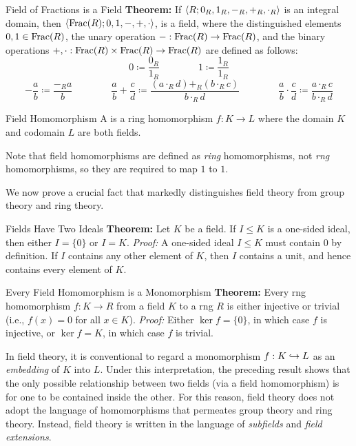 \begin{thmbox}{Field of Fractions is a Field}
	\textbf{Theorem:} If ${\langle {R; 0_R, 1_R, -_R, +_R, \cdot_R} \rangle}$ is an integral domain, then ${\langle {\operatorname{Frac}(R); 0, 1, -, +, \cdot} \rangle}$, is a field, where the distinguished elements $0, 1 \in \operatorname{Frac}(R)$, the unary operation $-: \operatorname{Frac}(R) \to \operatorname{Frac}(R)$, and the binary operations $+, \cdot: \operatorname{Frac}(R) \times \operatorname{Frac}(R) \to \operatorname{Frac}(R)$ are defined as follows:
	\[ 0 \coloneq \frac{0_R}{1_R}
	\qquad\qquad
	1 \coloneq \frac{1_R}{1_R} \]
	\[ -\frac{a}{b} \coloneq \frac{-_R a}{b}
	\qquad\qquad
	\frac{a}{b} + \frac{c}{d} \coloneq \frac{(a \cdot_R d) +_R (b \cdot_R c)}{b \cdot_R d}
	\qquad\qquad
	\frac{a}{b} \cdot \frac{c}{d} \coloneq \frac{a \cdot_R c}{b \cdot_R d} \]
\end{thmbox}

\begin{dfnbox}{Field Homomorphism}
	A  is a ring homomorphism $f: K \to L$ where the domain $K$ and codomain $L$ are both fields.
\end{dfnbox}

Note that field homomorphisms are defined as \textit{ring} homomorphisms, not \textit{rng} homomorphisms, so they are required to map $1$ to $1$.

We now prove a crucial fact that markedly distinguishes field theory from group theory and ring theory.

\begin{thmbox}{Fields Have Two Ideals}
	\textbf{Theorem:} Let $K$ be a field. If $I \le K$ is a one-sided ideal, then either $I = \{0\}$ or $I = K$.
\tcblower
	\textit{Proof:} A one-sided ideal $I \le K$ must contain $0$ by definition. If $I$ contains any other element of $K$, then $I$ contains a unit, and hence contains every element of $K$.
\end{thmbox}

\begin{thmbox}{Every Field Homomorphism is a Monomorphism}
	\textbf{Theorem:} Every rng homomorphism $f: K \to R$ from a field $K$ to a rng $R$ is either injective or trivial (i.e., $f(x) = 0$ for all $x \in K$).
\tcblower
	\textit{Proof:} Either $\ker f = \{0\}$, in which case $f$ is injective, or $\ker f = K$, in which case $f$ is trivial.
\end{thmbox}

In field theory, it is conventional to regard a monomorphism $f: K \hookrightarrow L$ as an \textit{embedding} of $K$ into $L$. Under this interpretation, the preceding result shows that the only possible relationship between two fields (via a field homomorphism) is for one to be contained inside the other. For this reason, field theory does not adopt the language of homomorphisms that permeates group theory and ring theory. Instead, field theory is written in the language of \textit{subfields} and \textit{field extensions}.

